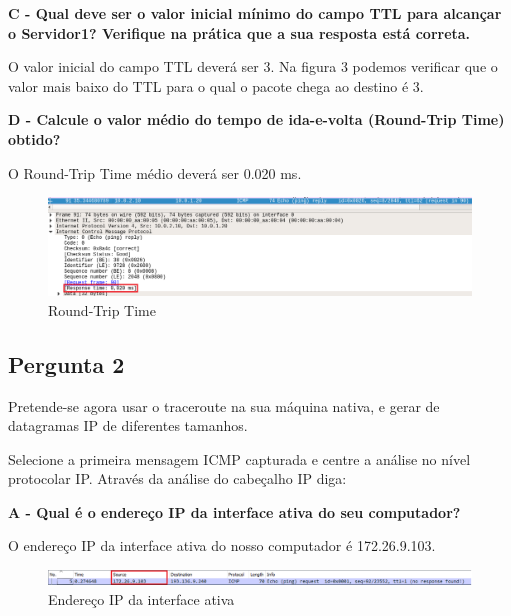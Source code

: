 \documentclass[11pt]{article}
\begin{document}
\vspace{0.5cm}

\textbf{C - Qual deve ser o valor inicial mínimo do campo TTL para alcançar o Servidor1? Verifique na prática que a sua resposta está correta.}

O valor inicial do campo TTL deverá ser 3. Na figura 3 podemos verificar que o valor mais baixo do TTL para o qual o pacote chega ao destino é 3.

\vspace{1cm}

\textbf{D - Calcule o valor médio do tempo de ida-e-volta (Round-Trip Time) obtido?}

O Round-Trip Time médio deverá ser 0.020 ms.

\begin{figure}[hbt!]
    \centering
    \includegraphics[width=\textwidth]{images/parte1/topologia/round_trip.png}
    \caption{Round-Trip Time}
\end{figure}

\subsection{Pergunta 2}

Pretende-se agora usar o traceroute na sua máquina nativa, e gerar de datagramas IP de diferentes tamanhos.

Selecione a primeira mensagem ICMP capturada e centre a análise no nível protocolar IP. Através da análise do cabeçalho IP diga: 

\vspace{0.5cm}

\textbf{A - Qual é o endereço IP da interface ativa do seu computador?}

O endereço IP da interface ativa do nosso computador é 172.26.9.103.

\begin{figure}[hbt!]
    \centering
    \includegraphics[width=\textwidth]{images/parte1/default/endereco_ip.png}
    \caption{Endereço IP da interface ativa}
\end{figure}
\end{document}

